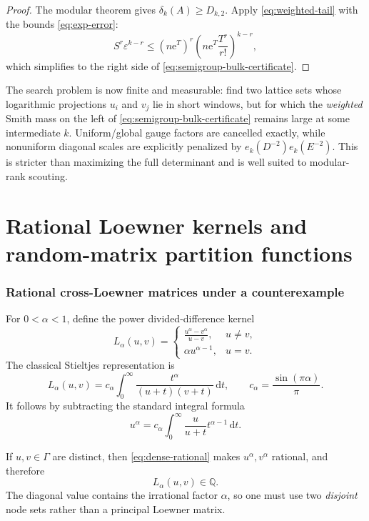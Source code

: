 \documentclass[11pt,oneside]{article}
\theoremstyle{definition}
\theoremstyle{remark}
\newcommand{\Q}{\mathbb{Q}}
\newcommand{\dd}{\,\mathrm{d}}
\newcommand{\eps}{\varepsilon}
\newcommand{\e}{\mathrm{e}}
\begin{document}
\begin{proof}
The modular theorem gives $\delta_k(A)\ge D_{k,2}$.  Apply \eqref{eq:weighted-tail} with the bounds \eqref{eq:exp-error}:
\[
 S^r\eps^{k-r}
 \le(n\e^T)^r
 \left(n\e^T\frac{T^r}{r!}\right)^{k-r},
\]
which simplifies to the right side of \eqref{eq:semigroup-bulk-certificate}.
\end{proof}

\begin{targetbox}
The search problem is now finite and measurable: find two lattice sets whose logarithmic projections $u_i$ and $v_j$ lie in short windows, but for which the \emph{weighted} Smith mass on the left of \eqref{eq:semigroup-bulk-certificate} remains large at some intermediate $k$.  Uniform/global gauge factors are cancelled exactly, while nonuniform diagonal scales are explicitly penalized by $e_k(D^{-2})e_k(E^{-2})$.  This is stricter than maximizing the full determinant and is well suited to modular-rank scouting.
\end{targetbox}

\part{Rational Loewner kernels and random-matrix partition functions}

\section{Rational cross-Loewner matrices under a counterexample}
\label{sec:loewner}

For $0<\alpha<1$, define the power divided-difference kernel
\begin{equation}
 L_\alpha(u,v)=
 \begin{cases}
 \displaystyle\frac{u^\alpha-v^\alpha}{u-v},&u\ne v,\\[1.1ex]
 \alpha u^{\alpha-1},&u=v.
 \end{cases}
 \label{eq:loewner-kernel}
\end{equation}
The classical Stieltjes representation is
\begin{equation}
 L_\alpha(u,v)
 =c_\alpha\int_0^\infty
 \frac{t^\alpha}{(u+t)(v+t)}\dd t,
 \qquad
 c_\alpha=\frac{\sin(\pi\alpha)}{\pi}.
 \label{eq:loewner-integral}
\end{equation}
It follows by subtracting the standard integral formula
\[
 u^\alpha=c_\alpha\int_0^\infty\frac{u}{u+t}t^{\alpha-1}\dd t.
\]

If $u,v\in\Gamma$ are distinct, then \eqref{eq:dense-rational} makes $u^\alpha,v^\alpha$ rational, and therefore
\begin{equation}
 L_\alpha(u,v)\in\Q.
 \label{eq:loewner-rational}
\end{equation}
The diagonal value contains the irrational factor $\alpha$, so one must use two \emph{disjoint} node sets rather than a principal Loewner matrix.
\end{document}
